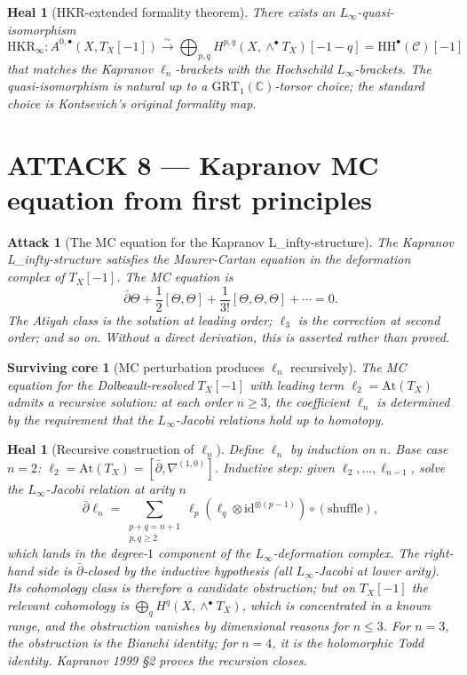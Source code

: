 \documentclass[11pt]{article}
\newtheorem{attack}[theorem]{Attack}
\newtheorem{heal}[theorem]{Heal}
\newtheorem{surviving}[theorem]{Surviving core}
\providecommand{\At}{\mathrm{At}}
\providecommand{\HH}{\mathrm{HH}}
\providecommand{\id}{\mathrm{id}}
\providecommand{\cC}{\mathcal{C}}
\providecommand{\CC}{\mathbb{C}}
\begin{document}
\begin{heal}[HKR-extended formality theorem]
\label{heal:7}
There exists an $L_\infty$-quasi-isomorphism
\[
  \mathrm{HKR}_\infty: A^{0,\bullet}(X, T_X[-1]) \xrightarrow{\sim}
    \bigoplus_{p,q} H^{p,q}(X, \wedge^\bullet T_X)[-1-q] = \HH^\bullet(\cC)[-1]
\]
that matches the Kapranov $\ell_n$-brackets with the Hochschild
$L_\infty$-brackets. The quasi-isomorphism is natural up to a
$\mathrm{GRT}_1(\CC)$-torsor choice; the standard choice is Kontsevich's
original formality map.
\end{heal}

\section{ATTACK 8 --- Kapranov MC equation from first principles}
\label{sec:attack-8}

\begin{attack}[The MC equation for the Kapranov L_infty-structure]
\label{atk:8}
The Kapranov L_infty-structure satisfies the Maurer-Cartan equation in
the deformation complex of $T_X[-1]$. The MC equation is
\[
  \bar\partial \Theta + \frac{1}{2}[\Theta, \Theta] + \frac{1}{3!}[\Theta,
    \Theta, \Theta] + \cdots = 0.
\]
The Atiyah class is the solution at leading order; $\ell_3$ is the
correction at second order; and so on. Without a direct derivation,
this is asserted rather than proved.
\end{attack}

\begin{surviving}[MC perturbation produces $\ell_n$ recursively]
\label{surv:8}
The MC equation for the Dolbeault-resolved $T_X[-1]$ with leading term
$\ell_2 = \At(T_X)$ admits a recursive solution: at each order $n \geq
3$, the coefficient $\ell_n$ is determined by the requirement that the
$L_\infty$-Jacobi relations hold up to homotopy.
\end{surviving}

\begin{heal}[Recursive construction of $\ell_n$]
\label{heal:8}
Define $\ell_n$ by induction on $n$. Base case $n = 2$: $\ell_2 =
\At(T_X) = [\bar\partial, \nabla^{(1,0)}]$. Inductive step: given $\ell_2,
\ldots, \ell_{n-1}$, solve the $L_\infty$-Jacobi relation at arity $n$
\[
  \bar\partial \ell_n = \sum_{\substack{p + q = n + 1 \\ p, q \geq 2}}
    \ell_p(\ell_q \otimes \id^{\otimes(p-1)}) \circ (\text{shuffle}),
\]
which lands in the degree-$1$ component of the $L_\infty$-deformation
complex. The right-hand side is $\bar\partial$-closed by the
inductive hypothesis (all $L_\infty$-Jacobi at lower arity). Its
cohomology class is therefore a candidate obstruction; but on $T_X[-1]$
the relevant cohomology is $\bigoplus_q H^q(X, \wedge^\bullet T_X)$,
which is concentrated in a known range, and the obstruction vanishes
by dimensional reasons for $n \leq 3$. For $n = 3$, the obstruction
is the Bianchi identity; for $n = 4$, it is the holomorphic Todd
identity. Kapranov 1999 \S 2 proves the recursion closes.
\end{heal}
\end{document}
